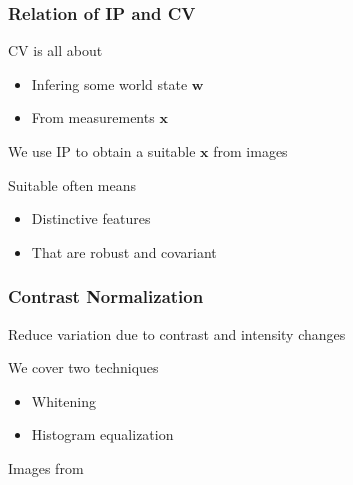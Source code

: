 \documentclass[xetex,professionalfont]{beamer}
\renewcommand{\vec}[1]{\ensuremath{\mathbf{#1}}}
\newcommand{\vw}{\vec{w}}
\newcommand{\vx}{\vec{x}}
\begin{document}

\begin{frame}
\frametitle{Relation of IP and CV}

CV is all about
\begin{itemize}
	\item Infering some world state $\vw$
	\item From measurements $\vx$
\end{itemize}

\bigskip
We use IP to obtain a suitable $\vx$ from images %

\bigskip
Suitable often means
\begin{itemize}
	\item Distinctive features %
	\item That are robust and covariant %
\end{itemize}

\end{frame}


\begin{frame}
\frametitle{Contrast Normalization}

Reduce variation due to contrast and intensity changes

\bigskip
We cover two techniques
\begin{itemize}
	\item Whitening
	\item Histogram equalization
\end{itemize}

\medskip
\begin{center}
	{\centering Images from \cite{prince12}}
\end{center}

\end{frame}

\end{document}

